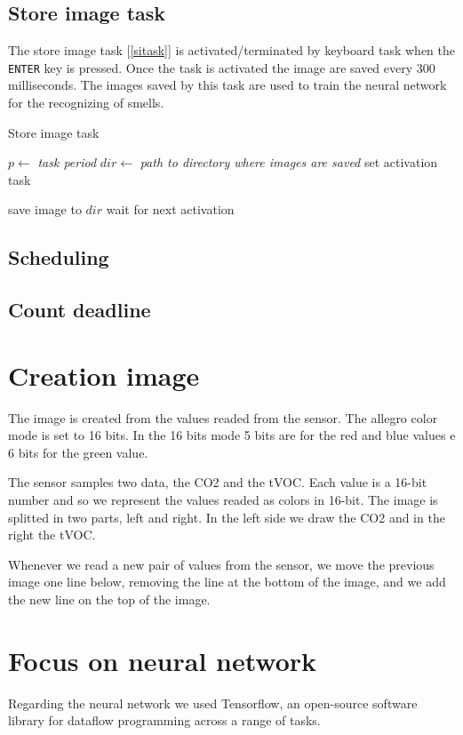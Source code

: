 \documentclass[12pt]{article}
\begin{document}
\subsection{Store image task}
The store image task [\ref{sitask}] is activated/terminated by keyboard task
when the \texttt{ENTER} key is pressed. Once the task is activated the image
are saved every $300$ milliseconds. The images saved by this task are used to
train the neural network for the recognizing of smells.

\begin{algorithm}[t]
\caption{Store image task}
\label{sitask}

\begin{algorithmic}
\State $p\gets$ \textit{task period}
\State $dir\gets$ \textit{path to directory where images are saved}
\State set activation task

\Loop
\State save image to $dir$
\State wait for next activation
\EndLoop

\end{algorithmic}
\end{algorithm}

\subsection{Scheduling}
\subsection{Count deadline}

\section{Creation image}
The image is created from the values readed from the sensor. The allegro color 
mode is set to 16 bits. In the 16 bits mode 5 bits are for the red and blue 
values e 6 bits for the green value. 

The sensor samples two data, the CO2 and the tVOC. Each value is a 16-bit number
and so we represent the values readed as colors in 16-bit. The image is splitted
in two parts, left and right. In the left side we draw the CO2 and in the right 
the tVOC.

Whenever we read a new pair of values from the sensor, we move the previous 
image one line below, removing the line at the bottom of the image, and we add 
the new line on the top of the image.

\section{Focus on neural network}
Regarding the neural network we used Tensorflow, an open-source software 
library for dataflow programming across a range of tasks. 
\end{document}
